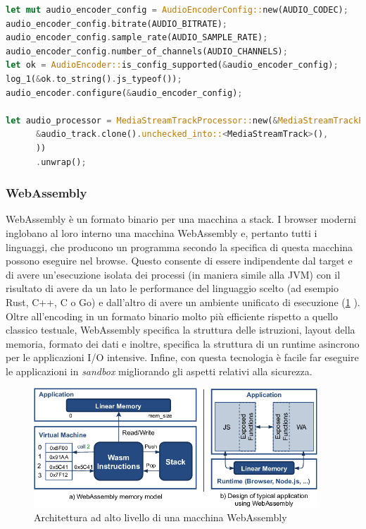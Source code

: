 \documentclass{article}
\begin{document}
\begin{lstlisting}[language=Rust, style=boxed, label={lst:audio-encoder-example}, captionpos=b,caption={Accesso e configurazione di AudioEncoder}]
let mut audio_encoder_config = AudioEncoderConfig::new(AUDIO_CODEC);
audio_encoder_config.bitrate(AUDIO_BITRATE);
audio_encoder_config.sample_rate(AUDIO_SAMPLE_RATE);
audio_encoder_config.number_of_channels(AUDIO_CHANNELS);
let ok = AudioEncoder::is_config_supported(&audio_encoder_config);
log_1(&ok.to_string().js_typeof());
audio_encoder.configure(&audio_encoder_config);

let audio_processor = MediaStreamTrackProcessor::new(&MediaStreamTrackProcessorInit::new(
      &audio_track.clone().unchecked_into::<MediaStreamTrack>(),
      ))
      .unwrap();

\end{lstlisting}
\subsubsection{WebAssembly} \label{section:web-assembly}
WebAssembly \cite{rossberg2021webassembly} è un formato binario per una macchina a stack. I browser moderni inglobano al 
loro interno una macchina WebAssembly e, pertanto tutti i linguaggi, che producono un programma
secondo la specifica di questa macchina possono eseguire nel browse. Questo consente di essere indipendente dal target e di avere 
un'esecuzione isolata dei processi (in maniera simile alla JVM) con il risultato di avere 
da un lato le performance del linguaggio scelto (ad esempio Rust, C++, C o Go) e dall'altro di 
avere un ambiente unificato di esecuzione (\cref{fig:web-assembly-arch}
). Oltre all'encoding in un formato binario molto 
più efficiente rispetto a quello classico testuale, WebAssembly specifica la struttura delle
istruzioni, layout della memoria, formato dei dati e inoltre, specifica la struttura di 
un runtime asincrono per le applicazioni I/O intensive. Infine, con questa tecnologia è 
facile far eseguire le applicazioni in \textit{sandbox} migliorando gli aspetti relativi 
alla sicurezza.

\begin{figure}
  \begin{center}
    \includegraphics[width=0.95\textwidth]{figures/WebAssembly-high-level-architecture.png}
  \end{center}
  \caption{Architettura ad alto livello di una macchina WebAssembly}\label{fig:web-assembly-arch}
\end{figure}
\end{document}
